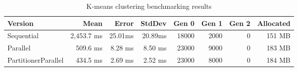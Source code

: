 \begin{table}[ht]%
    \centering
    \caption{K-means clustering benchmarking results}
		\label{tab: KMeansBenchmarking}
    \begin{tabularx}{\linewidth}{Xrrrrrrr} \toprule
			\bfseries Version 	&
			\bfseries Mean    	&
			\bfseries Error	    &
			\bfseries StdDev	  &
			\bfseries Gen 0	    &
			\bfseries Gen 1	    &
			\bfseries Gen 2	    &
			\bfseries Allocated \\ 
			\midrule 
Sequential & 2,453.7 ms	& 25.01ms	& 20.89ms	& 18000 & 	2000 & 	0 & 151 MB \\
Parallel & 509.6 ms	& 8.28 ms	& 8.50 ms	& 23000 & 	9000 & 	0 & 183 MB \\ 
PartitionerParallel & 434.5 ms	& 2.69 ms	& 2.52 ms	& 23000 & 	8000 & 	0 & 184 MB \\
			\bottomrule
    \end{tabularx}
\end{table}